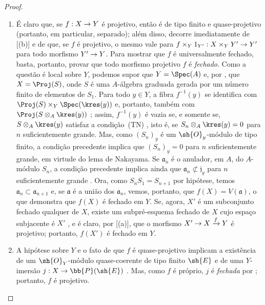 \documentclass[oneside,10pt]{amsart}
\makeatletter
\newcommand{\ega@arrow}[2]{\mathchoice{#1}{#2}{#2}{#2}}
\renewcommand{\to}{\ega@arrow{\longrightarrow}{\rightarrow}}
\makeatother
\begin{document}
\begin{proof}
\medskip\noindent
\begin{enumerate}
  \item[(i)] É claro que, se $f:X\to Y$ é projetivo, então é de tipo finito e quase-projetivo (portanto, em particular, separado); além disso, decorre imediatamente de [(b)] e de  que, se $f$ é projetivo, o mesmo vale para $f\times_Y 1_{Y'}:X\times_Y Y'\to Y'$ para todo morfismo $Y'\to Y$.
    Para mostrar que $f$ é universalmente fechado, basta, portanto, provar que todo morfismo projetivo $f$ é \emph{fechado}.
    Como a questão é local sobre $Y$, podemos supor que $Y=\Spec(A)$ e, por , que $X=\Proj(S)$, onde $S$ é uma $A$-álgebra graduada gerada por um número finito de elementos de $S_1$.
    Para todo $y\in Y$, a fibra $f^{-1}(y)$ se identifica com $\Proj(S)\times_Y\Spec(\kres(y))$  e, portanto, também com $\Proj(S\otimes_A\kres(y))$ ;
    assim, $f^{-1}(y)$ é vazia se, e somente se, $S\otimes_A\kres(y)$ satisfaz a condição~(TN) , isto é, se $S_n\otimes_A\kres(y)=0$ para $n$ suficientemente grande.
    Mas, como $(S_n)_y$ é um $\sh{O}_y$-módulo de tipo finito, a condição precedente implica que $(S_n)_y=0$ para $n$ suficientemente grande, em virtude do lema de Nakayama.
    Se $\mathfrak{a}_n$ é o anulador, em $A$, do $A$-módulo $S_n$, a condição precedente implica ainda que $\mathfrak{a}_n\not\subset\mathfrak{j}_y$ para $n$ suficientemente grande .
    Ora, como $S_nS_1=S_{n+1}$ por hipótese, temos $\mathfrak{a}_n\subset\mathfrak{a}_{n+1}$ e, se $\mathfrak{a}$ é a união dos $\mathfrak{a}_n$, vemos, portanto, que $f(X)=V(\mathfrak{a})$, o que demonstra que $f(X)$ é fechado em $Y$.
    Se, agora, $X'$ é um subconjunto fechado qualquer de $X$, existe um subpré-esquema fechado de $X$ cujo espaço subjacente é $X'$ , e é claro, por [(a)], que o morfismo $X'\to X\xrightarrow{f}Y$ é projetivo; portanto, $f(X')$ é fechado em $Y$.
  \item[(ii)] A hipótese sobre $Y$ e o fato de que $f$ é quase-projetivo implicam a existência de um $\sh{O}_Y$-módulo quase-coerente de tipo finito $\sh{E}$ e de uma $Y$-imersão $j:X\to\bb{P}(\sh{E})$ .
    Mas, como $f$ é próprio, $j$ é \emph{fechada} por ; portanto, $f$ é projetivo.
\end{enumerate}
\end{proof}
\end{document}
